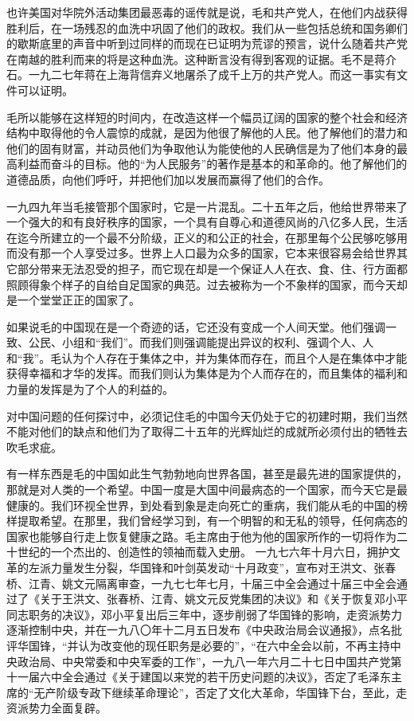 \begin{maonote}
也许美国对华院外活动集团最恶毒的谣传就是说，毛和共产党人，在他们内战获得胜利后，在一场残忍的血洗中巩固了他们的政权。我们从一些包括总统和国务卿们的歇斯底里的声音中听到过同样的而现在已证明为荒谬的预言，说什么随着共产党在南越的胜利而来的将是这种血洗。这种断言没有得到客观的证据。毛不是蒋介石。一九二七年蒋在上海背信弃义地屠杀了成千上万的共产党人。而这一事实有文件可以证明。

毛所以能够在这样短的时间内，在改造这样一个幅员辽阔的国家的整个社会和经济结构中取得他的令人震惊的成就，是因为他很了解他的人民。他了解他们的潜力和他们的固有财富，并动员他们为争取他认为能使他的人民确信是为了他们本身的最高利益而奋斗的目标。他的“为人民服务”的著作是基本的和革命的。他了解他们的道德品质，向他们呼吁，并把他们加以发展而赢得了他们的合作。

一九四九年当毛接管那个国家时，它是一片混乱。二十五年之后，他给世界带来了一个强大的和有良好秩序的国家，一个具有自尊心和道德风尚的八亿多人民，生活在迄今所建立的一个最不分阶级，正义的和公正的社会，在那里每个公民够吃够用而没有那一个人享受过多。世界上人口最为众多的国家，它本来很容易会给世界其它部分带来无法忍受的担子，而它现在却是一个保证人人在衣、食、住、行方面都照顾得象个样子的自给自足国家的典范。过去被称为一个不象样的国家，而今天却是一个堂堂正正的国家了。

如果说毛的中国现在是一个奇迹的话，它还没有变成一个人间天堂。他们强调一致、公民、小组和“我们”。而我们则强调能提出异议的权利、强调个人、人和“我”。毛认为个人存在于集体之中，并为集体而存在，而且个人是在集体中才能获得幸福和才华的发挥。而我们则认为集体是为个人而存在的，而且集体的福利和力量的发挥是为了个人的利益的。

对中国问题的任何探讨中，必须记住毛的中国今天仍处于它的初建时期，我们当然不能对他们的缺点和他们为了取得二十五年的光辉灿烂的成就所必须付出的牺牲去吹毛求疵。

有一样东西是毛的中国如此生气勃勃地向世界各国，甚至是最先进的国家提供的，那就是对人类的一个希望。中国一度是大国中间最病态的一个国家，而今天它是最健康的。我们环视全世界，到处看到象是走向死亡的重病，我们能从毛的中国的榜样提取希望。在那里，我们曾经学习到，有一个明智的和无私的领导，任何病态的国家也能够自行走上恢复健康之路。毛主席由于他为他的国家所作的一切将作为二十世纪的一个杰出的、创造性的领袖而载入史册。
一九七六年十月六日，拥护文革的左派力量发生分裂，华国锋和叶剑英发动“十月政变”，宣布对王洪文、张春桥、江青、姚文元隔离审查，一九七七年七月，十届三中全会通过十届三中全会通过了《关于王洪文、张春桥、江青、姚文元反党集团的决议》和《关于恢复邓小平同志职务的决议》，邓小平复出后三年中，逐步削弱了华国锋的影响，走资派势力逐渐控制中央，并在一九八〇年十二月五日发布《中央政治局会议通报》，点名批评华国锋，“并认为改变他的现任职务是必要的”，“在六中全会以前，不再主持中央政治局、中央常委和中央军委的工作”，一九八一年六月二十七日中国共产党第十一届六中全会通过《关于建国以来党的若干历史问题的决议》，否定了毛泽东主席的“无产阶级专政下继续革命理论”，否定了文化大革命，华国锋下台，至此，走资派势力全面复辟。
\end{maonote}
